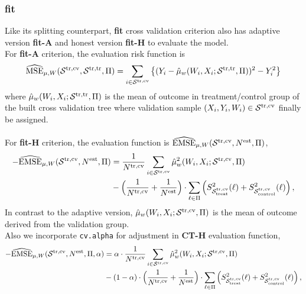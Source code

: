 \documentclass[11pt]{article}
\newcommand{\emse}{{\rm EMSE}}
\newcommand{\est}{{\rm est}}
\newcommand{\calp}{{\Pi}}
\newcommand{\cals}{{\cal S}}
\newcommand{\mse}{{\rm MSE}}
\newcommand{\control}{{\rm control}}
\newcommand{\treat}{{\rm treat}}
\newcommand{\train}{{\rm tr}}
\newcommand{\tcv}{{\rm cv}}
\begin{document}
\subsubsection{fit}
Like its splitting counterpart, \textbf{fit} cross validation criterion also has adaptive version \textbf{fit-A} and honest version \textbf{fit-H} to evaluate the model.\\
For \textbf{fit-A} criterion, the evaluation risk function is  
\[\widehat{\mse}_{\mu, W}(\cals^{\train, \tcv},\cals^{\train, \train},\calp) =  \sum_{i\in\cals^{\train, \tcv}} \left\{(Y_i-\hat\mu_w(W_i,X_i;\cals^{\train, \train},\calp))^2-Y^2_i\right\}\]
where $\hat\mu_w(W_i,X_i;\cals^{\train, \train},\calp)$ is the mean of outcome in treatment/control group of the built cross validation tree where validation sample $(X_i, Y_i, W_i) \in \cals^{\train, \tcv}$ finally be assigned.\\
\\
For \textbf{fit-H} criterion, the evaluation function is $\widehat{\emse}_{\mu, W}(\cals^{\train, \tcv}, N^\est, \calp)$,
\begin{align*}
-\widehat{\emse}_{\mu, W}(\cals^{\train, \tcv}, N^\est, \calp) & = 
\frac{1}{N^{\train, \tcv}}\sum_{i\in\cals^{\train, \tcv}} \hat\mu_w^2(W_i,X_i;\cals^{\train, \tcv},\calp) \\
& -
\Bigl(\frac{1}{N^{\train, \tcv}} + \frac{1}{N^\est}\Bigr)\cdot \sum_{\ell\in\calp}
\left( S^2_{\cals^{\train, \tcv}_\treat}(\ell)+ S^2_{\cals^{\train, \tcv}_\control}(\ell)\right),
\end{align*}
In contrast to the adaptive version, $\hat\mu_w(W_i,X_i;\cals^{\train, \tcv},\calp)$ is the mean of outcome derived from the validation group.\\
Also we incorporate \texttt{cv.alpha} for adjustment in \textbf{CT-H} evaluation function,
\begin{align*}
-\widehat{\emse}_{\mu, W}(\cals^{\train, \tcv}, N^\est, \calp, \alpha) & = 
\alpha \cdot \frac{1}{N^{\train, \tcv}}\sum_{i\in\cals^{\train, \tcv}} \hat\mu_w^2(W_i,X_i;\cals^{\train, \tcv},\calp) \\
& - (1 - \alpha) \cdot
\Bigl(\frac{1}{N^{\train, \tcv}} + \frac{1}{N^\est}\Bigr)\cdot \sum_{\ell\in\calp}
\left( S^2_{\cals^{\train, \tcv}_\treat}(\ell)+ S^2_{\cals^{\train, \tcv}_\control}(\ell)\right),
\end{align*}
\end{document}
